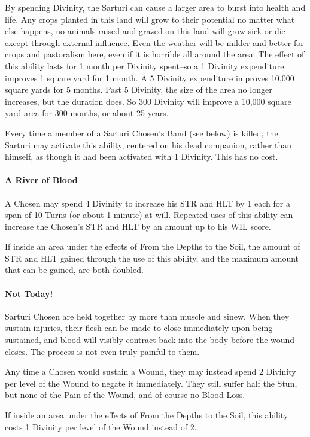 \documentclass[oneside,11pt,english]{book}
\begin{document}
By spending Divinity, the Sarturi can cause a larger area to burst into health and life. Any crops 
planted in this land will grow to their potential no matter what else happens, no animals raised 
and grazed on this land will grow sick or die except through external influence. Even the weather 
will be milder and better for crops and pastoralism here, even if it is horrible all around the area. 
The effect of this ability lasts for 1 month per Divinity spent--so a 1 Divinity expenditure 
improves 1 square yard for 1 month. A 5 Divinity expenditure improves 10,000 square yards for 5 
months. Past 5 Divinity, the size of the area no longer increases, but the duration does. So 300 
Divinity will improve a 10,000 square yard area for 300 months, or about 25 years. 


Every time a member of a Sarturi Chosen's Band (see below) is killed, the Sarturi may activate this ability, centered on his dead companion, rather than himself, as though it had been activated 
with 1 Divinity. This has no cost.
\paragraph{A River of Blood}
A Chosen may spend 4 Divinity to increase his STR and HLT by 1 each for a span of 10 Turns 
(or about 1 minute) at will. Repeated uses of this ability can increase the Chosen's STR and HLT 
by an amount up to his WIL score. 


If inside an area under the effects of From the Depths to the Soil, the amount of STR and HLT 
gained through the use of this ability, and the maximum amount that can be gained, are both 
doubled.
\paragraph{Not Today!}
Sarturi Chosen are held together by more than muscle and sinew. When they sustain injuries, 
their flesh can be made to close immediately upon being sustained, and blood will visibly contract 
back into the body before the wound closes. The process is not even truly painful to them. 


Any time a Chosen would sustain a Wound, they may instead spend 2 Divinity per level of the 
Wound to negate it immediately. They still suffer half the Stun, but none of the Pain of the 
Wound, and of course no Blood Loss. 


If inside an area under the effects of From the Depths to the Soil, this ability costs 1 Divinity per 
level of the Wound instead of 2. 
\end{document}
